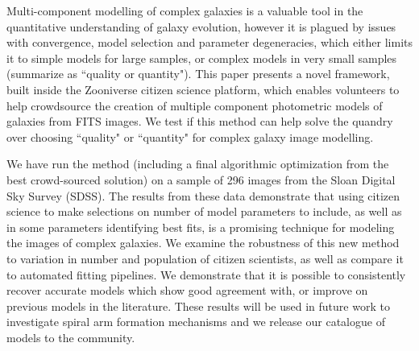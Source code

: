 \documentclass[../main.tex]{subfiles}
\begin{document}
Multi-component modelling of complex galaxies is a valuable tool in the quantitative understanding of galaxy evolution, however it is plagued by issues with convergence, model selection and parameter degeneracies, which either limits it to simple models for large samples, or complex models in very small samples (summarize as ``quality or quantity"). This paper presents a novel framework, built inside the Zooniverse citizen science platform, which enables volunteers to help crowdsource the creation of multiple component photometric models of galaxies from FITS images. We test if this method can help solve the quandry over choosing ``quality" or ``quantity" for complex galaxy image modelling.

We have run the method (including a final algorithmic optimization from the best crowd-sourced solution) on a sample of 296 images from the Sloan Digital Sky Survey (SDSS). The results from these data demonstrate that using citizen science to make selections on number of model parameters to include, as well as in some parameters identifying best fits, is a promising technique for modeling the images of complex galaxies. We examine the robustness of this new method to variation in number and population of citizen scientists, as well as compare it to automated fitting pipelines. We demonstrate that it is possible to consistently recover accurate models which show good agreement with, or improve on previous models in the literature. These results will be used in future work to investigate spiral arm formation mechanisms and we release our catalogue of models to the community.
\end{document}
